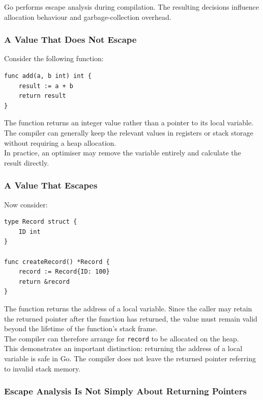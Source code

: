 Go performs escape analysis during compilation. The resulting decisions influence allocation behaviour and garbage-collection overhead.\\

\subsubsection{A Value That Does Not Escape}

Consider the following function:

\begin{lstlisting}
func add(a, b int) int {
    result := a + b
    return result
}
\end{lstlisting}

The function returns an integer value rather than a pointer to its local variable. The compiler can generally keep the relevant values in registers or stack storage without requiring a heap allocation.\\

In practice, an optimiser may remove the variable entirely and calculate the result directly.

\subsubsection{A Value That Escapes}

Now consider:

\begin{lstlisting}
type Record struct {
    ID int
}

func createRecord() *Record {
    record := Record{ID: 100}
    return &record
}
\end{lstlisting}

The function returns the address of a local variable. Since the caller may retain the returned pointer after the function has returned, the value must remain valid beyond the lifetime of the function's stack frame.\\

The compiler can therefore arrange for \texttt{record} to be allocated on the heap.\\

This demonstrates an important distinction: returning the address of a local variable is safe in Go. The compiler does not leave the returned pointer referring to invalid stack memory.\\

\subsubsection{Escape Analysis Is Not Simply About Returning Pointers}

